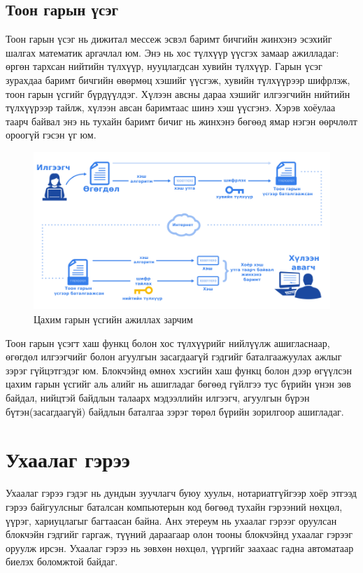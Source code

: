 \subsection{Тоон гарын үсэг}
Тоон гарын үсэг нь дижитал мессеж эсвэл баримт бичгийн жинхэнэ эсэхийг шалгах математик аргачлал юм. Энэ нь хос түлхүүр үүсгэх замаар ажилладаг: өргөн тархсан нийтийн түлхүүр, нууцлагдсан хувийн түлхүүр. Гарын үсэг зурахдаа баримт бичгийн өвөрмөц хэшийг үүсгэж, хувийн түлхүүрээр шифрлэж, тоон гарын үсгийг бүрдүүлдэг. Хүлээн авсны дараа хэшийг илгээгчийн нийтийн түлхүүрээр тайлж, хүлээн авсан баримтаас шинэ хэш үүсгэнэ. Хэрэв хоёулаа таарч байвал энэ нь тухайн баримт бичиг нь жинхэнэ бөгөөд ямар нэгэн өөрчлөлт ороогүй гэсэн үг юм.

\begin{figure}[h]
	\centering
	\includegraphics[scale=0.5]{src/images/dig-sign.png}
	\caption{Цахим гарын үсгийн ажиллах зарчим}
\end{figure}

\newpage

Тоон гарын үсэгт хаш функц болон хос түлхүүрийг нийлүүлж ашигласнаар, өгөгдөл илгээгчийг болон агуулгын засагдаагүй гэдгийг баталгаажуулах ажлыг зэрэг гүйцэтгэдэг юм. Блокчэйнд өмнөх хэсгийн хаш функц болон дээр өгүүлсэн цахим гарын үсгийг аль алийг нь ашигладаг бөгөөд гүйлгээ тус бүрийн үнэн зөв байдал, нийцтэй байдлын талаарх мэдээллийн илгээгч, агуулгын бүрэн бүтэн(засагдаагүй) байдлын баталгаа зэрэг төрөл бүрийн зорилгоор ашигладаг.

\section{Ухаалаг гэрээ}
Ухаалаг гэрээ гэдэг нь дундын зуучлагч буюу хуульч, нотариатгүйгээр хоёр этгээд гэрээ байгуулсныг баталсан компьютерын код бөгөөд тухайн гэрээний нөхцөл, үүрэг, хариуцлагыг багтаасан байна. Анх этереум нь ухаалаг гэрээг оруулсан блокчэйн гэдгийг гаргаж, түүний дараагаар олон тооны блокчэйнд ухаалаг гэрээг оруулж ирсэн. Ухаалаг гэрээ нь зөвхөн нөхцөл, үүргийг заахаас гадна автоматаар биелэх боломжтой байдаг.

